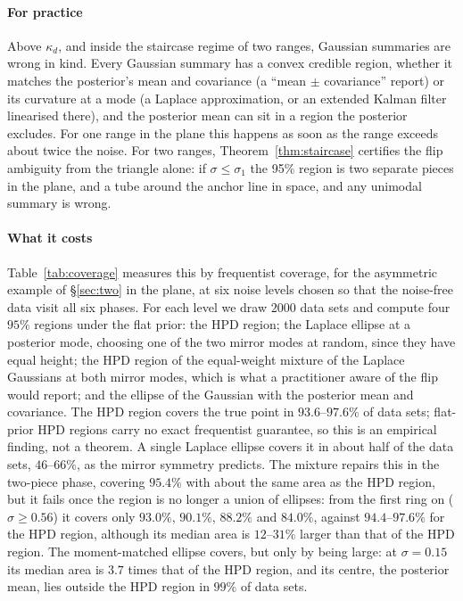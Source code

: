 \paragraph{For practice} Above $\kappa_d$, and inside the staircase regime of two ranges, Gaussian summaries are wrong
in kind. Every Gaussian summary has a convex credible region, whether it matches the posterior's mean and covariance (a
``mean $\pm$ covariance'' report) or its curvature at a mode (a Laplace approximation, or an extended Kalman filter
linearised there), and the posterior mean can sit in a region the posterior excludes. For one range in the plane this
happens as soon as the range exceeds about twice the noise. For two ranges,
Theorem~\ref{thm:staircase} certifies the flip ambiguity from the triangle alone: if $\sigma \le \sigma_1$ the 95\%
region is two separate pieces in the plane, and a tube around the anchor line in space, and any unimodal summary is
wrong.

\paragraph{What it costs} Table~\ref{tab:coverage} measures this by frequentist coverage, for the asymmetric example of
\S\ref{sec:two} in the plane, at six noise levels chosen so that the noise-free data visit all six phases. For each level
we draw $2000$ data sets and compute four $95\%$ regions under the flat prior: the HPD region; the Laplace ellipse at a
posterior mode, choosing one of the two mirror modes at random, since they have equal height; the HPD region of the
equal-weight mixture of the Laplace Gaussians at both mirror modes, which is what a practitioner aware of the flip would
report; and the ellipse of the Gaussian with the posterior mean and covariance. The HPD region covers the true point in
$93.6$--$97.6\%$ of data sets; flat-prior HPD regions carry no exact frequentist guarantee, so this is an empirical
finding, not a theorem. A single Laplace ellipse covers it in about half of the data sets, $46$--$66\%$, as the mirror
symmetry predicts. The mixture repairs this in the two-piece phase, covering $95.4\%$ with about the same area as the
HPD region, but it fails once the region is no longer a union of ellipses: from the first ring on ($\sigma \ge 0.56$) it
covers only $93.0\%$, $90.1\%$, $88.2\%$ and $84.0\%$, against $94.4$--$97.6\%$ for the HPD region, although its
median area is $12$--$31\%$ larger than that of the
HPD region. The moment-matched ellipse covers, but only by being large: at $\sigma = 0.15$ its median area is $3.7$ times
that of the HPD region, and its centre, the posterior mean, lies outside the HPD region in $99\%$ of data sets.

